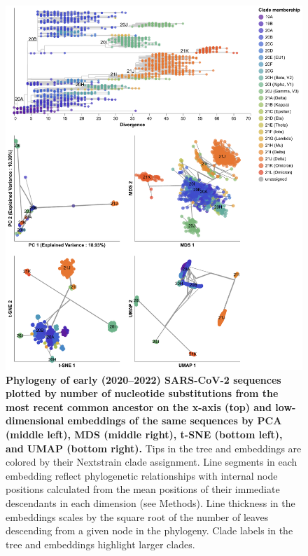 \documentclass[webpdf,contemporary,large,single]{oup-authoring-template}%
\theoremstyle{thmstyleone}%
\theoremstyle{thmstyletwo}%
\theoremstyle{thmstylethree}%
\begin{document}
\begin{figure}[!h]
\includegraphics[width=0.9\columnwidth]{figures/sarscov2-embeddings-by-Nextstrain_clade-clade.png}
\caption{{\bf Phylogeny of early (2020--2022) SARS-CoV-2 sequences plotted by number of nucleotide substitutions from the most recent common ancestor on the x-axis (top) and low-dimensional embeddings of the same sequences by PCA (middle left), MDS (middle right), t-SNE (bottom left), and UMAP (bottom right).}
  Tips in the tree and embeddings are colored by their Nextstrain clade assignment.
  Line segments in each embedding reflect phylogenetic relationships with internal node positions calculated from the mean positions of their immediate descendants in each dimension (see Methods).
  Line thickness in the embeddings scales by the square root of the number of leaves descending from a given node in the phylogeny.
  Clade labels in the tree and embeddings highlight larger clades.
}
\label{fig:sars-cov-2-early-embeddings-by-Nextstrain-clade}
\end{figure}
\end{document}
